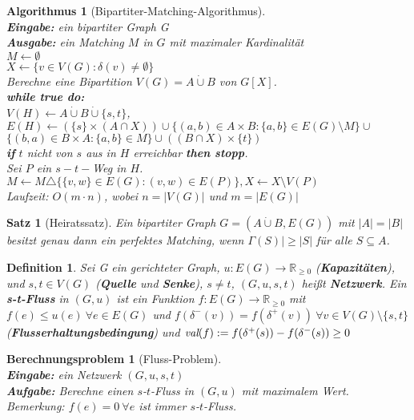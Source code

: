 \documentclass[12pt,a4paper]{article}
\theoremstyle{plain}
\newtheorem{Satz}[Theorem]{Satz}
\newtheorem{Definition}[Theorem]{Definition}
\newtheorem{Algorithmus}[Theorem]{Algorithmus}
\newtheorem{Berechnungsproblem}[Theorem]{Berechnungsproblem}
\newcommand{\herv}[1]{{\emph{\textbf{#1}}}}
\newcommand{\R}{\mathbb{R}}
\newcommand{\cupdot}{\mathbin{\dot{\cup}}}
\numberwithin{equation}{section}
\begin{document}
\begin{Algorithmus}[Bipartiter-Matching-Algorithmus]\\
\textbf{Eingabe:} ein bipartiter Graph G\\
\textbf{Ausgabe:} ein Matching $M$ in $G$ mit maximaler Kardinalität\\
$M\leftarrow \emptyset$\\
$X\leftarrow \{v\in V(G):\delta(v)\neq \emptyset\}$\\
Berechne eine Bipartition $V(G)=A\cupdot B$ von $G[X]$.\\
\textbf{while true do:}\\
\text{\qquad} $V(H) \leftarrow A\cupdot B\cupdot\{s,t\}$,\\
\text{\qquad} $E(H)\leftarrow \left( \{s\}\times (A \cap X)\right) \cup \{(a,b)\in A\times B:\{a,b\}\in E(G)\setminus M\} \cup$ \\ \text{\qquad\qquad\qquad} $ \{(b,a)\in B\times A: \{a,b\}\in M\} \cup \left( (B\cap X) \times \{t\}\right)$ \\
\text{\qquad} \textbf{if} $t$ nicht von $s$ aus in $H$ erreichbar \textbf{then stopp}.\\
\text{\qquad} Sei $P$ ein $s-t-$Weg in $H$.\\
\text{\qquad} $M\leftarrow M \triangle \{\{v,w\} \in E(G):(v,w)\in E(P)\}, X \leftarrow X \setminus V(P)$\\
Laufzeit: $O(m\cdot n)$, wobei $n=|V(G)|$ und $m=|E(G)|$
\end{Algorithmus}
\begin{Satz}[Heiratssatz]
Ein bipartiter Graph $G=(A\cupdot B, E(G))$ mit $|A|=|B|$ besitzt genau dann ein perfektes Matching, wenn $\Gamma(S)|\geq |S|$ für alle $S\subseteq A$.
\end{Satz}
\begin{Definition}
Sei G ein gerichteter Graph, $u: E(G) \rightarrow \R_{\geq 0}$ (\herv{Kapazitäten}), und $s,t\in V(G)$ (\herv{Quelle} und \herv{Senke}), $s\neq t$, $(G,u,s,t)$ heißt \herv{Netzwerk}. Ein \herv{s-t-Fluss} in $(G,u)$ ist ein Funktion $f:E(G) \rightarrow \R_{\geq 0}$ mit $f(e)\leq u(e)\ \forall e \in E(G)$ und $f(\delta^-(v))=f(\delta^+(v))\ \forall v\in V(G)\setminus\{s,t\}$ (\herv{Flusserhaltungsbedingung}) und $\emph{val}(f):= f(\delta^+(s))-f(\delta^-(s))\geq 0$
\end{Definition}
\begin{Berechnungsproblem}[Fluss-Problem]\\
\textbf{Eingabe:} ein Netzwerk $(G,u,s,t)$\\
\textbf{Aufgabe:} Berechne einen $s$-$t$-Fluss in $(G,u)$ mit maximalem Wert.\\
\textit{Bemerkung:} $f(e)=0\ \forall e$ ist immer $s$-$t$-Fluss.
\end{Berechnungsproblem}
\end{document}
